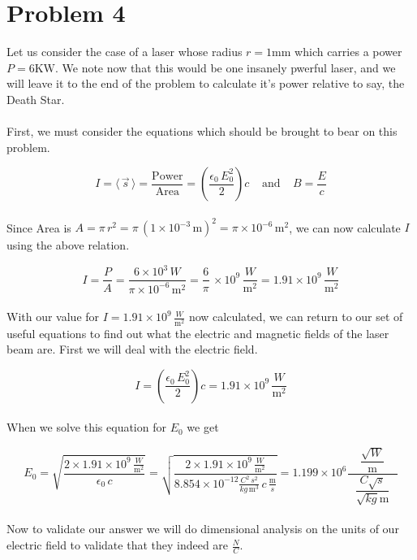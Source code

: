 \section*{Problem 4}

Let us consider the case of a laser whose radius $r = 1\mathrm{mm}$ which carries a power $P = 6\mathrm{KW}$. We note now that this would be one insanely pwerful laser, and we will leave it to the end of the problem to calculate it's power relative to say, the Death Star. 
\\
\\
First, we must consider the equations which should be brought to bear on this problem.

\begin{equation*}
	I = \langle \, \vec{s} \, \rangle = 
	\dfrac{\mathrm{Power}}{\mathrm{Area}} = 
	\left(\dfrac{\epsilon_0 \,E_0^2}{2}\right)c \; \; \; \; \mathrm{and} \; \; \; \; B = \dfrac{E}{c}
\end{equation*}
\\
Since Area is $A = \pi \,r^2 = \pi \, (1\times10^{-3}\,\mathrm{m})^2 = \pi \times 10^{-6}\,\mathrm{m}^2$, we can now calculate $I$ using the above 
relation.

\begin{equation*}
	I = \dfrac{P}{A} = \dfrac{6\times 10^3\,W}{\pi \times 10^{-6}\, \mathrm{m}^2} = \dfrac{6}{\pi}\, \times 10^9\, \dfrac{W}{\mathrm{m}^2} = 
	1.91 \times 10^9 \, \dfrac{W}{\mathrm{m}^2}
\end{equation*}
\\
With our value for $I = 1.91 \times 10^9 \, \frac{W}{\mathrm{m}^2}$ now calculated, we can return to our set of useful equations to find out what the electric and magnetic fields of the laser beam are. First we will deal with the electric field.

\begin{equation*}
	I = \left(\dfrac{\epsilon_0 \,E_0^2}{2}\right)c = 1.91 \times 10^9 \, \frac{W}{\mathrm{m}^2}
\end{equation*}
\\
When we solve this equation for $E_0$ we get 

\begin{equation*}
	E_0 = \sqrt{\frac{2 \times 1.91 \times 10^9 \, \frac{W}{\mathrm{m}^2}}{\epsilon_0 \, c}} =
	\sqrt{\frac{2 \times 1.91 \times 10^9 \, 
		  \frac{W}{\mathrm{m}^2}}{8.854 \times 10^{-12} \frac{C^2\,s^2}{kg\,\mathrm{m}^3} \, c \, \frac{\mathrm{m}}{s}}} 
	= 1.199 \times 10^6 \dfrac{\;\;\;\;\dfrac{\sqrt{W}}{\mathrm{m}}\;\;\;\;}{\dfrac{C \sqrt{s}}{\sqrt{kg} \mathrm{m}}}
\end{equation*}
\\
Now to validate our answer we will do dimensional analysis on the units of our electric field to validate that they indeed are $\frac{N}{C}$.

